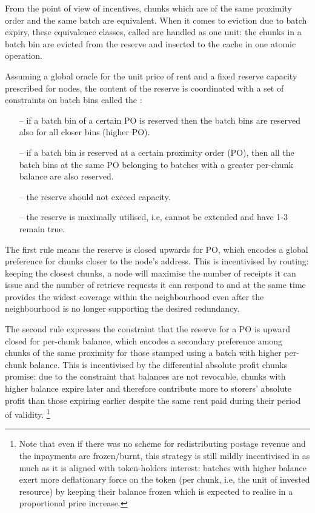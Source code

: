 From the point of view of incentives, chunks which are of the same proximity order and the same batch are equivalent. When it comes to eviction due to batch expiry, these equivalence classes, called  are handled as one unit: the chunks in a batch bin are evicted from the reserve and inserted to the cache in one atomic operation. 

Assuming a global oracle for the unit price of rent and a fixed reserve capacity  prescribed for nodes, the content of the reserve is coordinated with  a set of constraints on batch bins called the :
\begin{itemize}[noitemsep]
    \item[--] if a batch bin of a certain PO is reserved then the batch bins are reserved also for all closer bins (higher PO). 
    \item[--] if a batch bin is reserved at a certain proximity order (PO), then all the batch bins at the same PO belonging to batches with a greater per-chunk balance are also reserved. 
    \item[--] the reserve should not exceed capacity.
    \item[--] the reserve is maximally utilised, i.e, cannot be extended and have 1-3 remain true.
\end{itemize}

The first rule means the reserve is closed upwards for PO, which encodes a global preference for  chunks closer to the node's address. This is incentivised by routing: keeping the closest chunks, a node will maximise the number of receipts it can issue and the number of retrieve requests it can respond to and at the same time provides the widest coverage within the neighbourhood even after the neighbourhood is no longer supporting the desired redundancy.

The second rule expresses the constraint that the reserve for a PO is upward closed for per-chunk balance, which encodes a secondary preference among chunks of the same proximity for those stamped using a batch with higher per-chunk balance. This is incentivised by the differential absolute profit chunks promise: due to the  constraint that balances are not revocable, chunks with higher balance expire later and therefore contribute more to storers' absolute profit than those expiring earlier despite the same rent paid during their period of validity.%
%
\footnote{Note that even if there was no scheme for redistributing postage revenue and the inpayments are frozen/burnt, this strategy is still mildly incentivised in as much as it is aligned with token-holders interest: batches with higher balance exert more deflationary force on the token (per chunk, i.e, the unit of invested resource) by keeping their balance frozen which is expected to realise in a proportional price increase.}


